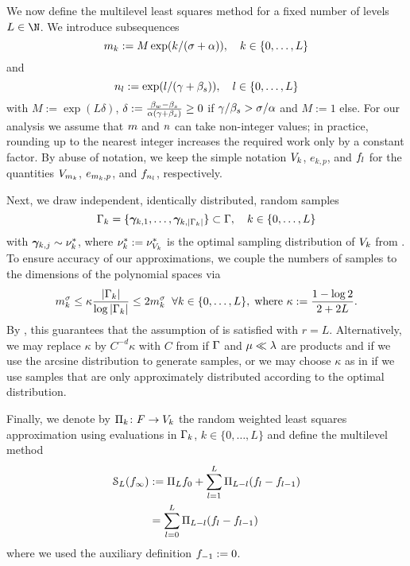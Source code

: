 We now define the multilevel least squares method for a fixed number of levels $L\in\N$. We introduce subsequences
\begin{equation}
\label{eq:subseq}
m_k:=M\exp(k/({\sigma+\alpha})), \quad k\in\{0,\dots,L\}
\end{equation} and 
\begin{equation*}
n_l:=\exp(l/(\gamma+\beta_{s})), \quad l\in\{0,\dots,L\}
\end{equation*} with $M:=\exp(L\delta)$, $\delta:=\frac{\beta_{w}-\beta_{s}}{\alpha(\gamma+\beta_{s})}\geq 0$ if $\gamma/\beta_{s}>\sigma/\alpha$ and $M:=1$ else. For our analysis we assume that $m$ and $n$ can take non-integer values; in practice, rounding up to the nearest integer increases the required work only by a constant factor. By abuse of notation, we keep the simple notation $V_k$, $e_{k,p}$,  and $f_{l}$ for the quantities $V_{m_k}$, $e_{m_k,p}$, and $f_{n_l}$, respectively. 

Next, we draw independent, identically distributed, random samples
\begin{equation*}
\Gamma_k=\{\bm{\gamma}_{k,1},\dots,\bm{\gamma}_{k,|\Gamma_k|}\}\subset \Gamma, \quad k\in \{0,\dots,L\}
\end{equation*}
with $\bm{\gamma}_{k,j}\sim \nu^{*}_{k}$, where $\nu^{*}_{k}:=\nu^{*}_{V_k}$ is the optimal sampling distribution of $V_{k}$ from . To ensure accuracy of our approximations, we couple the numbers of samples to the dimensions of the polynomial spaces via
\begin{equation}
\label{eq:size}
m_k^{\sigma}\leq \kappa \frac{|\Gamma_k|}{\log |\Gamma_k|}\leq 2 m_k^{\sigma}\;\;\forall k\in\{0,\dots,L\},\;\text{where } \kappa:=\frac{1-\log 2}{2+2L}.
\end{equation}
 By , this guarantees that the assumption of  is satisfied with $r=L$. Alternatively, we may replace $\kappa$ by $C^{-d}\kappa$ with $C$ from  if $\Gamma$ and $\mu\ll \lambda$ are products and if we use the arcsine distribution to generate samples, or we may choose $\kappa$ as in  if we use samples that are only approximately distributed according to the optimal distribution. 

Finally, we denote by $\Pi_{k}\colon F\to V_k$ the random weighted least squares approximation using evaluations in $\Gamma_k$, $k\in\{0,\dots,L\}$ and define the multilevel method
\begin{equation}
\label{eq:mldef}
\begin{split}
\mathcal{S}_{L}(f_{\infty})&:=\Pi_{L}f_{0}+\sum_{l=1}^{L}\Pi_{L-l}(f_{l}-f_{l-1})\\&=\sum_{l=0}^{L}\Pi_{L-l}(f_{l}-f_{l-1})
\end{split}
\end{equation}
where we used the auxiliary definition $f_{-1}:=0$. 

